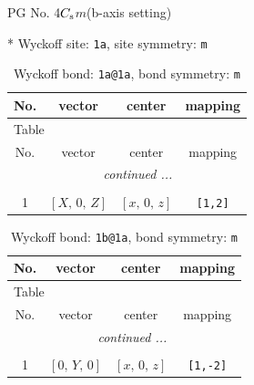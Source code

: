 \documentclass[fleqn,8pt]{jsarticle}
\begin{document}
\setcounter{MaxMatrixCols}{32}

\renewcommand{\tablename}{Table~}
\renewcommand{\figurename}{Figure~}
\begin{center}
\LARGE
PG No. 4\quad$C_{\rm s}$\quad$m$\quad(b-axis setting)\quad[ monoclinic ]
\end{center}


* Wyckoff site: {\tt 1a}, site symmetry: {\tt m}
\renewcommand{\arraystretch}{1.2}
\begin{longtable}{cccc}
\caption{Wyckoff bond: {\tt 1a@1a}, bond symmetry: {\tt m}}
 \\
 \hline \hline
No. & vector & center & mapping \\ \hline \endfirsthead

\multicolumn{3}{l}{\tablename\ \thetable{}} \\
 \hline \hline
No. & vector & center & mapping \\ \hline \endhead

 \hline \hline
\multicolumn{3}{r}{\footnotesize\it continued ...} \\ \endfoot

 \hline \hline
\multicolumn{3}{r}{} \\ \endlastfoot

1 & $\left[ X,\, 0,\, Z \right]$ & $\left[ x,\, 0,\, z \right]$ & {\tt [1,2]} \\
\end{longtable}
\renewcommand{\arraystretch}{1.2}
\begin{longtable}{cccc}
\caption{Wyckoff bond: {\tt 1b@1a}, bond symmetry: {\tt m}}
 \\
 \hline \hline
No. & vector & center & mapping \\ \hline \endfirsthead

\multicolumn{3}{l}{\tablename\ \thetable{}} \\
 \hline \hline
No. & vector & center & mapping \\ \hline \endhead

 \hline \hline
\multicolumn{3}{r}{\footnotesize\it continued ...} \\ \endfoot

 \hline \hline
\multicolumn{3}{r}{} \\ \endlastfoot

1 & $\left[ 0,\, Y,\, 0 \right]$ & $\left[ x,\, 0,\, z \right]$ & {\tt [1,-2]} \\
\end{longtable}
\renewcommand{\arraystretch}{1.2}
\end{document}
